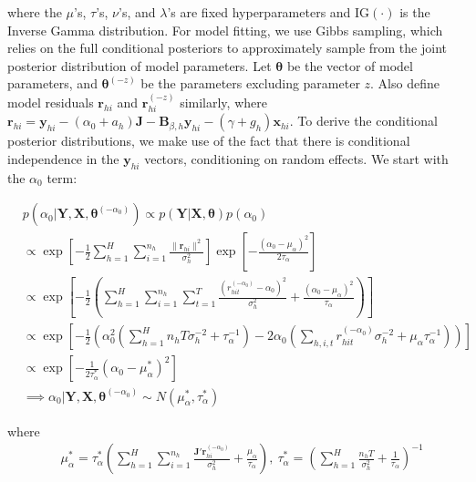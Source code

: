 \documentclass{article}
\begin{document}
\noindent where the $\mu$'s, $\tau$'s, $\nu$'s, and $\lambda$'s are fixed hyperparameters and $\text{IG}(\cdot)$ is the Inverse Gamma distribution. %
For model fitting, we use Gibbs sampling, which relies on the full conditional posteriors to approximately sample from the joint posterior distribution of model parameters. Let $\boldsymbol{\theta}$ be the vector of model parameters, and $\boldsymbol{\theta}^{(-z)}$ be the parameters excluding parameter $z$. Also define model residuals $\mathbf{r}_{hi}$ and $\mathbf{r}_{hi}^{(-z)}$ similarly, where $\mathbf{r}_{hi}=\mathbf{y}_{hi}-(\alpha_0+a_h) \mathbf{J}-\mathbf{B}_{\beta,h} \mathbf{y}_{hi}-(\gamma+g_h) \mathbf{x}_{hi}$. To derive the conditional posterior distributions, we make use of the fact that there is conditional independence in the $\mathbf{y}_{hi}$ vectors, conditioning on random effects. We start with the $\alpha_0$ term:

\begin{align*}
    & p(\alpha_0 | \mathbf{Y}, \mathbf{X}, \boldsymbol{\theta}^{(-\alpha_0)}) \propto p(\mathbf{Y}|\mathbf{X}, \boldsymbol{\theta}) p(\alpha_0) \\
    & \propto \exp\left[-\frac{1}{2} \sum_{h=1}^H \sum_{i=1}^{n_h} \frac{\|\mathbf{r}_{hi} \|^2}{\sigma_h^2} \right] \exp\left[-\frac{(\alpha_0-\mu_{\alpha})^2}{2\tau_{\alpha}}\right] \\
    & \propto \exp\left[-\frac{1}{2}\left( \sum_{h=1}^H \sum_{i=1}^{n_h} \sum_{t=1}^T \frac{(r_{hit}^{(-\alpha_0)}-\alpha_0)^2}{\sigma_h^2}+\frac{(\alpha_0-\mu_{\alpha})^2}{\tau_{\alpha}} \right)\right] \\
    & \propto \exp\left[-\frac{1}{2}\left(\alpha_0^2\left(\sum_{h=1}^H n_h T \sigma_h^{-2}+\tau_{\alpha}^{-1} \right)-2\alpha_0\left(\sum_{h,i,t} r_{hit}^{(-\alpha_0)} \sigma_h^{-2}+\mu_{\alpha} \tau_{\alpha}^{-1} \right) \right) \right] \\
    & \propto \exp\left[-\frac{1}{2{\tau}_{\alpha}^*}(\alpha_0-{\mu}_{\alpha}^*)^2 \right] \\
    & \implies \alpha_0 | \mathbf{Y}, \mathbf{X}, \boldsymbol{\theta}^{(-\alpha_0)} \sim N({\mu}^*_{\alpha}, {\tau}^*_{\alpha})
\end{align*}

\noindent where
\begin{align*}
    & {\mu}^*_{\alpha}={\tau}^*_{\alpha}\left(\sum_{h=1}^H \sum_{i=1}^{n_h} \frac{\mathbf{J}'\mathbf{r}_{hi}^{(-\alpha_0)}}{\sigma_h^2}+\frac{\mu_{\alpha}}{ \tau_{\alpha}} \right), \ {\tau}^*_{\alpha}=\left(\sum_{h=1}^H \frac{n_h T}{ \sigma_h^{2}}+\frac{1}{\tau_{\alpha}} \right)^{-1}
\end{align*}
\end{document}
